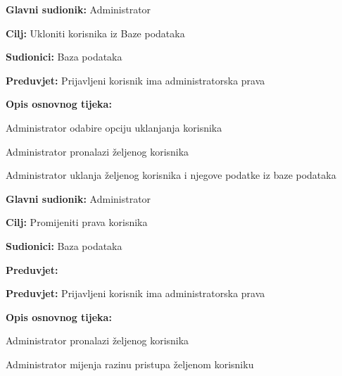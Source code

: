                         \noindent {}
					\begin{packed_item}
	
						\item \textbf{Glavni sudionik: }Administrator
						\item  \textbf{Cilj:} Ukloniti korisnika iz Baze podataka
						\item  \textbf{Sudionici:} Baza podataka
						\item  \textbf{Preduvjet:} Prijavljeni korisnik ima administratorska prava
						\item  \textbf{Opis osnovnog tijeka:}
						
						\item[] \begin{packed_enum}
	
							\item Administrator odabire opciju uklanjanja korisnika
							\item Administrator pronalazi željenog korisnika
							\item Administrator uklanja željenog korisnika i njegove podatke iz baze podataka
							
						\end{packed_enum}

					\end{packed_item}

                        \noindent {}
					\begin{packed_item}
	
						\item \textbf{Glavni sudionik: }Administrator
						\item  \textbf{Cilj:} Promijeniti prava korisnika
						\item  \textbf{Sudionici:} Baza podataka
						\item  \textbf{Preduvjet:} 						
						\item  \textbf{Preduvjet:} Prijavljeni korisnik ima administratorska prava
						\item  \textbf{Opis osnovnog tijeka:}
						
						\item[] \begin{packed_enum}
	
							\item Administrator pronalazi željenog korisnika
							\item Administrator mijenja razinu pristupa željenom korisniku
							
							
						\end{packed_enum}

					\end{packed_item}

